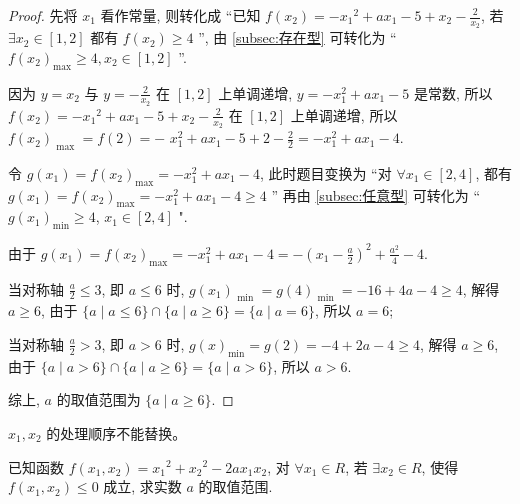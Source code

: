 \begin{proof}
  先将 \({x}_{1}\) 看作常量, 则转化成 “已知 \(f\left( {x}_{2}\right)  =  -{x}_{1}{}^{2} + a{x}_{1} -5 + {x}_{2} -\frac{2}{{x}_{2}}\), 若 \(\exists {x}_{2} \in  \left\lbrack  {1, 2}\right\rbrack\) 都有 \(f\left( {x}_{2}\right)  \geq  4\) ”, 由 \ref{subsec:存在型} 可转化为 “ \(f{\left( {x}_{2}\right) }_{\max } \geq  4, {x}_{2} \in  \left\lbrack  {1, 2}\right\rbrack\) ”.

因为 \(y = {x}_{2}\) 与 \(y =  -\frac{2}{{x}_{2}}\) 在 \(\left\lbrack  {1, 2}\right\rbrack\) 上单调递增, \(y =  -{x}_{1}^{2} + a{x}_{1} -5\) 是常数, 所以 \(f\left( {x}_{2}\right)  =  -{x}_{1}{}^{2} + a{x}_{1} -5 + {x}_{2} -\frac{2}{{x}_{2}}\) 在 \(\left\lbrack  {1, 2}\right\rbrack\) 上单调递增, 所以 \(f{\left( {x}_{2}\right) }_{\text{ max }} = f\left( 2\right)  =  -\)  \({x}_{1}^{2} + a{x}_{1} -5 + 2 -\frac{2}{2} =  -{x}_{1}^{2} + a{x}_{1} -4.\)

令 \(g\left( {x}_{1}\right)  = f{\left( {x}_{2}\right) }_{\max } =  -{x}_{1}^{2} + a{x}_{1} -4\), 此时题目变换为 “对 \(\forall {x}_{1} \in  \left\lbrack  {2, 4}\right\rbrack\), 都有 \(g\left( {x}_{1}\right)  = f{\left( {x}_{2}\right) }_{\max } =  -{x}_{1}^{2} + a{x}_{1} -4 \geq  4\) ” 再由 \ref{subsec:任意型} 可转化为 “ \(g{\left( {x}_{1}\right) }_{\min } \geq  4\), \({x}_{1} \in  \left\lbrack  {2, 4}\right\rbrack\) ".

由于 \(g\left( {x}_{1}\right)  = f{\left( {x}_{2}\right) }_{\max } =  -{x}_{1}^{2} + a{x}_{1} -4 =  -{\left( {x}_{1} -\frac{a}{2}\right) }^{2} + \frac{{a}^{2}}{4} -4\).

当对称轴 \(\frac{a}{2} \leq  3\), 即 \(a \leq  6\) 时, \(g{\left( {x}_{1}\right) }_{\text{ min }} = g{\left( 4\right) }_{\text{ min }} =  -{16} + {4a} -4 \geq  4\), 解得 \(a \geq  6\), 由于 \(\{ a \mid  a \leq  6\}  \cap  \{ a \mid  a \geq  6\}  = \{ a \mid  a = 6\}\), 所以 \(a = 6\);

当对称轴 \(\frac{a}{2} > 3\), 即 \(a > 6\) 时, \(g{(x) }_{\min } = g\left( 2\right)  =  -4 + {2a} -4 \geq  4\), 解得 \(a \geq  6\), 由于 \(\{ a \mid  a > 6\}  \cap  \{ a \mid  a \geq  6\}  = \{ a \mid  a > 6\}\), 所以 \(a > 6\).

综上, \(a\) 的取值范围为 \(\{ a \mid  a \geq  6\}\).
\end{proof}

\begin{remark}
  \({x}_{1}, {x}_{2}\) 的处理顺序不能替换。
\end{remark}

\begin{counterexample}\label{counterexample:2.2.2.1}
  已知函数 \(f(x_1, x_2)  = {x}_{1}{}^{2} + {x}_{2}{}^{2} -{2a}{x}_{1}{x}_{2}\), 对 \(\forall {x}_{1} \in  R\), 若 \(\exists {x}_{2} \in  R\), 使得 \(f(x_1, x_2)  \leq  0\) 成立, 求实数 \(a\) 的取值范围.
\end{counterexample}

